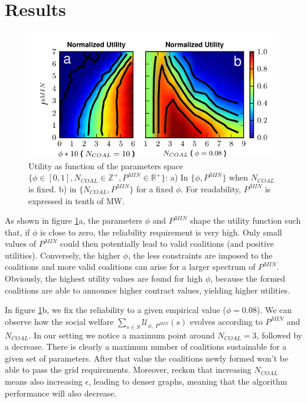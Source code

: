 \documentclass[conference]{IEEEtran}
\begin{document}
\section{Results}
\label{sec:results}

\begin{figure}
 \centering
  \includegraphics[scale=0.9]{./figure9/util}
\caption{Utility as function of the parameters space $\{\phi \in [0,1], N_{COAL}\in \mathbb{Z}^+, P^{MIN} \in \mathbb{R}^+\}$: a) In $ \{\phi, P^{MIN}\} $ when $ N_{COAL} $ is fixed. b) in $ \{N_{COAL}, P^{MIN}\} $ for a fixed $ \phi $. For readability, $ P^{MIN} $ is expressed in tenth of MW.}
\label{Fig2}
\end{figure}

As shown in figure \ref{Fig2}a, the parameters $\phi$ and $P^{MIN}$ shape the utility function such that, if $ \phi $ is close to zero, the reliability requirement is very high. Only small values of $ P^{MIN}$ could then potentially lead to valid coalitions (and positive utilities). Conversely, the higher $\phi$, the less constraints are imposed to the coalitions and more valid coalitions can arise for a larger spectrum of $ P^{MIN}$. Obviously, the highest utility values are found for high $ \phi $, because the formed coalitions are able to announce higher contract values, yielding higher utilities. 

In figure \ref{Fig2}b, we fix the reliability to a given empirical value ($\phi = 0.08 $). We can observe how the social welfare $\sum_{s \in S} \mathcal{U}_{\phi,\ P^{MIN}}(s)$ evolves according to $P^{MIN}$ and $ N_{COAL} $. In our setting we notice a maximum point around $ N_{COAL} = 3 $, followed by a decrease. There is clearly a maximum number of coalitions sustainable for a given set of parameters. After that value the coalitions newly formed won't be able to pass the grid requirements. Moreover, reckon that increasing $ N_{COAL} $ means also increasing $ \epsilon $, leading to denser graphs, meaning that the algorithm performance will also decrease.
\end{document}

